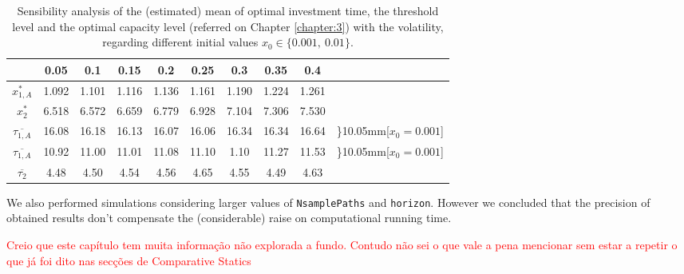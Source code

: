 \begin{table}[!ht]
	\centering
	\caption{Sensibility analysis of the (estimated) mean of optimal investment time, the threshold level and the optimal capacity level (referred on Chapter \ref{chapter:3}) with the volatility, regarding different initial values $x_0 \in \{0.001, \ 0.01\}$.}
	\begin{tabular}{c|ccccccccc}
		\hline
		\text{ $\sigma $ } & 0.05 & 0.1 & 0.15 & 0.2 & 0.25 & 0.3 & 0.35 & 0.4 \\ \hline
		$x_{1,A}^*$ & 1.092 & 1.101 & 1.116 & 1.136 & 1.161 & 1.190 & 1.224 & 1.261   \\
		$x_2^*$ & 6.518 & 6.572 & 6.659 & 6.779 & 6.928 & 7.104 & 7.306 & 7.530  \\ \hline
		$\overline{\tau _{1,A}}$ & 16.08 & 16.18 & 16.13 & 16.07 & 16.06 & 16.34 & 16.34 & 16.64  & \rdelim\}{1}{0.05mm}[$x_0=0.001$] \\
		$\overline{\tau _{1,A}}$ & 10.92 & 11.00 & 11.01 &  11.08 & 11.10 & 1.10 & 11.27 & 11.53 & \rdelim\}{1}{0.05mm}[$x_0=0.001$]  \\ \hline
		$\overline{\tau _2}$ & 4.48 & 4.50 & 4.54 & 4.56 & 4.65 & 4.55 & 4.49 & 4.63   \\ \hline
	\end{tabular}
\label{tab:vol_3}
\end{table}





\vspace{3mm}
 We also performed simulations considering larger values of \texttt{NsamplePaths} and \texttt{horizon}. However we concluded that the precision of obtained results don't compensate the (considerable) raise on computational running time.
 
 
\vspace{1cm}

\textcolor{red}{Creio que este capítulo tem muita informação não explorada a fundo. Contudo não sei o que vale a pena mencionar sem estar a repetir o que já foi dito nas secções de Comparative Statics}